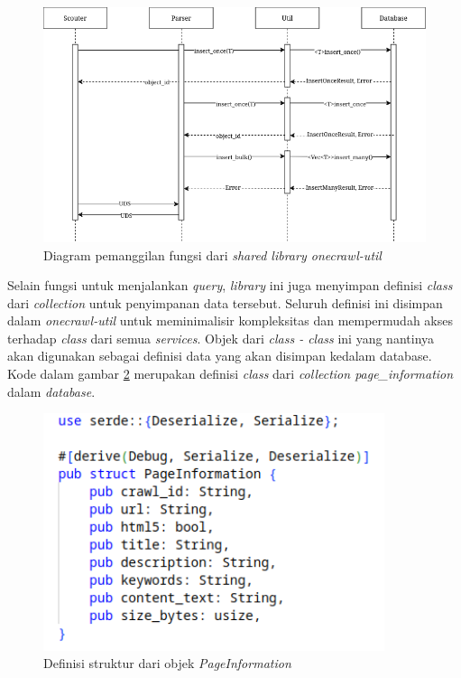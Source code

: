 \begin{figure}[H]
  \centering
  \includegraphics[keepaspectratio, width=13cm]{gambar/function-call-diagram.png}
  \caption{Diagram pemanggilan fungsi dari \emph{shared library onecrawl-util}}
  \label{gambar:function-call}
\end{figure}

Selain fungsi untuk menjalankan \emph{query}, \emph{library} ini juga menyimpan definisi \emph{class} dari \emph{collection} untuk penyimpanan data tersebut. Seluruh definisi ini disimpan dalam \emph{onecrawl-util} untuk meminimalisir kompleksitas dan mempermudah akses terhadap \emph{class} dari semua \emph{services}. Objek dari \emph{class - class} ini yang nantinya akan digunakan sebagai definisi data yang akan disimpan kedalam database. Kode dalam gambar \ref{gambar:struct-page-info} merupakan definisi \emph{class} dari \emph{collection page\_information} dalam \emph{database}. 

\begin{figure}[H]
  \centering
  \includegraphics[keepaspectratio, width=10cm]{gambar/struct-page-information.png}
  \caption{Definisi struktur dari objek \emph{PageInformation}}
  \label{gambar:struct-page-info}
\end{figure}

